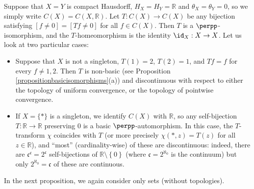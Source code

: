 \begin{example}
Suppose that $X=Y$ is compact Hausdorff, $H_X=H_Y=\mathbb{R}$ and $\theta_X=\theta_Y=0$, so we simply write $C(X)=C(X,\mathbb{R})$. Let $T:C(X)\to C(X)$ be any bijection satisfying $[f\neq 0]=[Tf\neq 0]$ for all $f\in C(X)$. Then $T$ is a $\perpp$-isomorphism, and the $T$-homeomorphism is the identity $\id_X:X\to X$. Let us look at two particular cases:
\begin{itemize}
\item Suppose that $X$ is not a singleton, $T(1)=2$, $T(2)=1$, and $Tf=f$ for every $f\neq 1,2$. Then $T$ is non-basic (see Proposition \ref{propositionbasicisomorphisms}(a)) and discontinuous with respect to either the topology of uniform convergence, or the topology of pointwise convergence.

\item If $X=\{\ast\}$ is a singleton, we identify $C(X)$ with $\mathbb{R}$, so any self-bijection $T:\mathbb{R}\to\mathbb{R}$ preserving $0$ is a basic $\perpp$-automorphism. In this case, the $T$-transform $\chi$ coincides with $T$ (or more precisely $\chi(\ast,z)=T(z)$ for all $z\in\mathbb{R}$), and ``most'' (cardinality-wise) of these are discontinuous: indeed, there are $\mathfrak{c}^\mathfrak{c}=2^\mathfrak{c}$ self-bijections of $\mathbb{R}\setminus\left\{0\right\}$ (where $\mathfrak{c}=2^{\aleph_0}$ is the continuum) but only $2^{\aleph_0}=\mathfrak{c}$ of these are continuous.
\end{itemize}
\end{example}

In the next proposition, we again consider only sets (without topologies).

